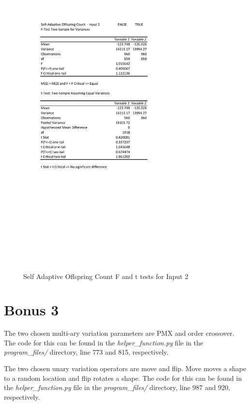 \documentclass[times]{article}
\begin{document}
	\begin{figure}
		\caption{Self Adaptive Offspring Count F and t tests for Input 2}
		\label{fig:saOffspring2}
		\includegraphics[width=\textwidth]{./t_test/S-AOffspringCount2}
	\end{figure}

	\section{Bonus 3}
	The two chosen multi-ary variation parameters are PMX and order crossover. The code for this can be found in the \textit{helper\_function.py} file in the \textit{program\_files/} directory, line 773 and 815, respectively.

	The two chosen unary variation operators are move and flip. Move moves a shape to a random location and flip rotates a shape. The code for this can be found in the \textit{helper\_function.py} file in the \textit{program\_files/} directory, line 987 and 920, respectively.
\end{document}
